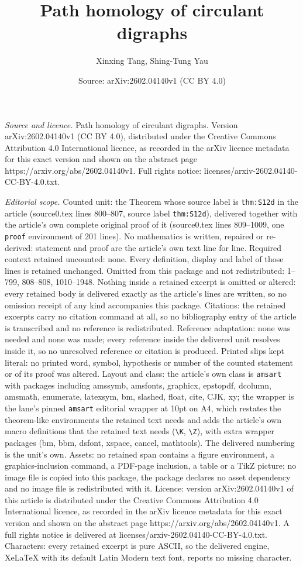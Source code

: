 \documentclass[10pt,a4paper]{amsart}
\title[Path homology of circulant digraphs]{Path homology of circulant digraphs}
\author{Xinxing Tang, Shing-Tung Yau}
\date{Source: arXiv:2602.04140v1 (CC BY 4.0)}
\begin{document}
\maketitle

\noindent\emph{Source and licence.} Path homology of circulant digraphs. Version arXiv:2602.04140v1 (CC BY 4.0), distributed under the Creative Commons Attribution 4.0 International licence, as recorded in the arXiv licence metadata for this exact version and shown on the abstract page https://arxiv.org/abs/2602.04140v1. Full rights notice: licenses/arxiv-2602.04140-CC-BY-4.0.txt.\par\smallskip

\noindent\textit{Editorial scope.} Counted unit: the Theorem whose source label is \texttt{thm:S12d} in the article (source0.tex lines 800--807, source label \texttt{thm:S12d}), delivered together with the article's own complete original proof of it (source0.tex lines 809--1009, one \texttt{proof} environment of 201 lines). No mathematics is written, repaired or re-derived: statement and proof are the article's own text line for line. Required context retained uncounted: none. Every definition, display and label of those lines is retained unchanged. Omitted from this package and not redistributed: 1--799, 808--808, 1010--1948. Nothing inside a retained excerpt is omitted or altered: every retained body is delivered exactly as the article's lines are written, so no omission receipt of any kind accompanies this package. Citations: the retained excerpts carry no citation command at all, so no bibliography entry of the article is transcribed and no reference is redistributed. Reference adaptation: none was needed and none was made; every reference inside the delivered unit resolves inside it, so no unresolved reference or citation is produced. Printed slips kept literal: no printed word, symbol, hypothesis or number of the counted statement or of its proof was altered. Layout and class: the article's own class is \texttt{amsart} with packages including amssymb, amsfonts, graphicx, epstopdf, dcolumn, amsmath, enumerate, latexsym, bm, slashed, float, cite, CJK, xy; the wrapper is the lane's pinned \texttt{amsart} editorial wrapper at 10pt on A4, which restates the theorem-like environments the retained text needs and adds the article's own macro definitions that the retained text needs (\texttt{\textbackslash K}, \texttt{\textbackslash Z}), with extra wrapper packages (bm, bbm, dsfont, xspace, cancel, mathtools). The delivered numbering is the unit's own. Assets: no retained span contains a figure environment, a graphics-inclusion command, a PDF-page inclusion, a table or a TikZ picture; no image file is copied into this package, the package declares no asset dependency and no image file is redistributed with it. Licence: version arXiv:2602.04140v1 of this article is distributed under the Creative Commons Attribution 4.0 International licence, as recorded in the arXiv licence metadata for this exact version and shown on the abstract page https://arxiv.org/abs/2602.04140v1. A full rights notice is delivered at licenses/arxiv-2602.04140-CC-BY-4.0.txt. Characters: every retained excerpt is pure ASCII, so the delivered engine, XeLaTeX with its default Latin Modern text font, reports no missing character.
\end{document}
